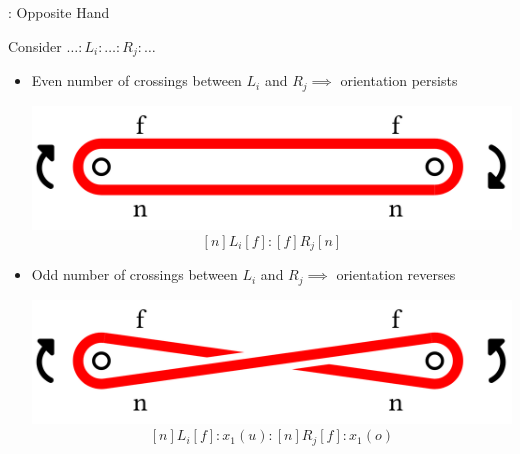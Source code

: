 \begin{frame}{\subsecname: Opposite Hand}
\begin{adjustwidth}{-1.5em}{-1.5em}
Consider $\ldots:L_i:\ldots:R_j:\ldots$
\begin{itemize}
    \item Even number of crossings between $L_i$ and $R_j\implies$ orientation persists\\
    \begin{center}
    \includegraphics[width=0.5\columnwidth]{figures/diff-even.png}
    $$
    [n]L_i[f]:[f]R_j[n]
    $$
    \end{center}
    \item Odd number of crossings between $L_i$ and $R_j\implies$ orientation reverses\\
    \begin{center}
    \includegraphics[width=0.5\columnwidth]{figures/diff-odd.png}
    $$
    [n]L_i[f]:x_1(u):[n]R_j[f]:x_1(o)
    $$
    \end{center}
\end{itemize}
\end{adjustwidth}
\end{frame}

